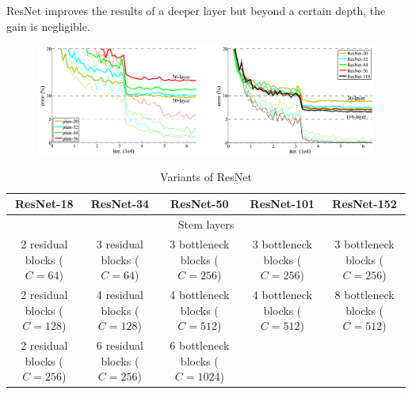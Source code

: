\begin{remark}
    ResNet improves the results of a deeper layer but beyond a certain depth, the gain is negligible.
    \begin{figure}[H]
        \centering
        \includegraphics[width=0.65\linewidth]{./img/resnet_results.png}
    \end{figure}
\end{remark}

\begin{table}[H]
    \centering
    \caption{Variants of ResNet}
    \scriptsize
    \begin{tabular}{c|c|c|c|c}
        \toprule
        \textbf{ResNet-18} & \textbf{ResNet-34} & \textbf{ResNet-50} & \textbf{ResNet-101} & \textbf{ResNet-152} \\
        \bottomrule
        \toprule
        \multicolumn{5}{c}{Stem layers} \\
        \midrule
            \makecell{2 residual blocks\\($C=64$)} & 
            \makecell{3 residual blocks\\($C=64$)} & 
            \makecell{3 bottleneck blocks\\($C=256$)} & 
            \makecell{3 bottleneck blocks\\($C=256$)} & 
            \makecell{3 bottleneck blocks\\($C=256$)} \\
        \midrule
            \makecell{2 residual blocks\\($C=128$)} & 
            \makecell{4 residual blocks\\($C=128$)} & 
            \makecell{4 bottleneck blocks\\($C=512$)} & 
            \makecell{4 bottleneck blocks\\($C=512$)} & 
            \makecell{8 bottleneck blocks\\($C=512$)} \\
        \midrule
            \makecell{2 residual blocks\\($C=256$)} & 
            \makecell{6 residual blocks\\($C=256$)} & 
            \makecell{6 bottleneck blocks\\($C=1024$)} & 

\end{tabular}
\end{table}
